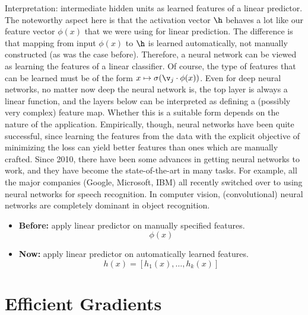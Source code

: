 Interpretation: intermediate hidden units as learned features of a linear predictor.
% 
The noteworthy aspect here is that the activation vector $\h$ behaves a lot like our feature vector $\phi(x)$ that we were using for linear prediction.
%
The difference is that mapping from input $\phi(x)$ to $\h$ is learned automatically, not manually constructed (as was the case before).
%
Therefore, a neural network can be viewed as learning the features of a linear classifier.
%
Of course, the type of features that can be learned must be of the form $x \mapsto \sigma(\v_j \cdot \phi(x))$.
%
Even for deep neural networks, no matter now deep the neural network is, the top layer is always a linear function,
%
and the layers below can be interpreted as defining a (possibly very complex) feature map.
%
Whether this is a suitable form depends on the nature of the application.
%
Empirically, though, neural networks have been quite successful,
%
since learning the features from the data with the explicit objective of minimizing the loss can yield better features than ones which are manually crafted.
%
Since 2010, there have been some advances in getting neural networks to work, and they have become the state-of-the-art in many tasks.
%
For example, all the major companies (Google, Microsoft, IBM) all recently switched over to using neural networks for speech recognition.
%
In computer vision, (convolutional) neural networks are completely dominant in object recognition.


\begin{example}
\begin{itemize}
	\item \textbf{Before:} apply linear predictor on manually specified features. %
		\[\phi(x)\]
	\item \textbf{Now:} apply linear predictor on automatically learned features.
		\[h(x) = [h_1(x), \dots, h_k(x)]\]
\end{itemize}
\end{example}



\section{Efficient Gradients} %
\label{sec:efficient_gradients}


